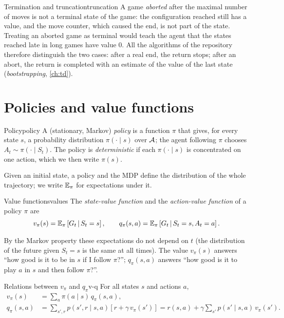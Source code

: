 \begin{remark}{Termination and truncation}{truncation}
  A game \emph{aborted} after the maximal number of moves is not a terminal
  state of the game: the configuration reached still has a value, and the
  move counter, which caused the end, is not part of the state. Treating an
  aborted game as terminal would teach the agent that the states reached
  late in long games have value $0$. All the algorithms of the repository
  therefore distinguish the two cases: after a real end, the return
  stops; after an abort, the return is completed with an estimate of the
  value of the last state (\emph{bootstrapping}, \cref{ch:td}).
\end{remark}

\section{Policies and value functions}

\begin{definition}{Policy}{policy}
  A (stationary, Markov) \emph{policy} is a function $\pi$ that gives, for
  every state $s$, a probability distribution $\pi(\cdot \mid s)$ over
  $\mathcal{A}$; the agent following $\pi$ chooses $A_t \sim \pi(\cdot \mid
  S_t)$. The policy is \emph{deterministic} if each $\pi(\cdot \mid s)$ is
  concentrated on one action, which we then write $\pi(s)$.
\end{definition}

Given an initial state, a policy and the MDP define the distribution of the
whole trajectory; we write $\mathbb{E}_\pi$ for expectations under it.

\begin{definition}{Value functions}{values}
  The \emph{state-value function} and the \emph{action-value function} of a
  policy $\pi$ are
  \begin{equation}
    v_\pi(s) = \mathbb{E}_\pi\left[G_t \,\middle|\, S_t = s\right], \qquad
    q_\pi(s, a) = \mathbb{E}_\pi\left[G_t \,\middle|\, S_t = s, A_t = a\right].
  \end{equation}
\end{definition}

By the Markov property these expectations do not depend on $t$ (the
distribution of the future given $S_t = s$ is the same at all times). The
value $v_\pi(s)$ answers ``how good is it to be in $s$ if I follow
$\pi$?''; $q_\pi(s, a)$ answers ``how good is it to play $a$ in $s$ and then
follow $\pi$?''.

\begin{proposition}{Relations between $v_\pi$ and $q_\pi$}{v-q}
  For all states $s$ and actions $a$,
  \begin{align}
    \label{eq:v-from-q}
    v_\pi(s) &= \sum_{a} \pi(a \mid s)\, q_\pi(s, a), \\
    \label{eq:q-from-v}
    q_\pi(s, a) &= \sum_{s', r} p(s', r \mid s, a)
      \left[ r + \gamma\, v_\pi(s') \right]
      = r(s, a) + \gamma \sum_{s'} p(s' \mid s, a)\, v_\pi(s').
  \end{align}
\end{proposition}


